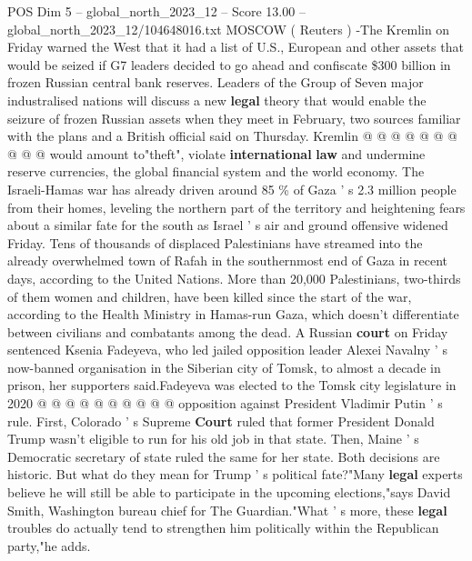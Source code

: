 \begin{textsample}{POS Dim 5 – global\_north\_2023\_12 – Score 13.00 – global\_north\_2023\_12/104648016.txt}
MOSCOW ( Reuters ) -The Kremlin on Friday warned the West that it had a list of U.S., European and other assets that would be seized if G7 leaders decided to go ahead and confiscate \$300 billion in frozen Russian central bank reserves.
Leaders of the Group of Seven major industralised nations will discuss a new \textbf{legal} theory that would enable the seizure of frozen Russian assets when they meet in February, two sources familiar with the plans and a British official said on Thursday.
Kremlin @ @ @ @ @ @ @ @ @ @ would amount to"theft", violate \textbf{international} \textbf{law} and undermine reserve currencies, the global financial system and the world economy.
The Israeli-Hamas war has already driven around 85 \% of Gaza ' s 2.3 million people from their homes, leveling the northern part of the territory and heightening fears about a similar fate for the south as Israel ' s air and ground offensive widened Friday.
Tens of thousands of displaced Palestinians have streamed into the already overwhelmed town of Rafah in the southernmost end of Gaza in recent days, according to the United Nations.
More than 20,000 Palestinians, two-thirds of them women and children, have been killed since the start of the war, according to the Health Ministry in Hamas-run Gaza, which doesn't differentiate between civilians and combatants among the dead.
A Russian \textbf{court} on Friday sentenced Ksenia Fadeyeva, who led jailed opposition leader Alexei Navalny ' s now-banned organisation in the Siberian city of Tomsk, to almost a decade in prison, her supporters said.Fadeyeva was elected to the Tomsk city legislature in 2020 @ @ @ @ @ @ @ @ @ @ opposition against President Vladimir Putin ' s rule.
First, Colorado ' s Supreme \textbf{Court} ruled that former President Donald Trump wasn't eligible to run for his old job in that state.
Then, Maine ' s Democratic secretary of state ruled the same for her state.
Both decisions are historic.
But what do they mean for Trump ' s political fate?"Many \textbf{legal} experts believe he will still be able to participate in the upcoming elections,"says David Smith, Washington bureau chief for The Guardian."What ' s more, these \textbf{legal} troubles do actually tend to strengthen him politically within the Republican party,"he adds.

\end{textsample}
